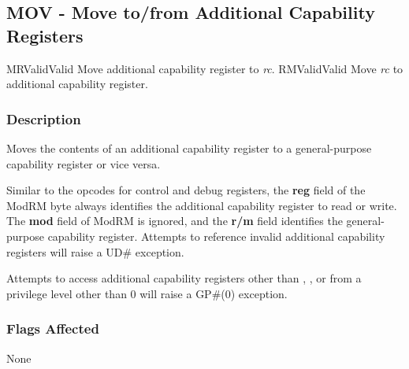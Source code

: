 \clearpage
{}
{}
\subsection*{MOV - Move to/from Additional Capability Registers}

\begin{x86opcodetable}
  {MR}{Valid}{Valid}
  {Move additional capability register to \emph{rc}.}
  {RM}{Valid}{Valid}
  {Move \emph{rc} to additional capability register.}
\end{x86opcodetable}

\begin{x86opentable}
\end{x86opentable}

\subsubsection*{Description}

Moves the contents of an additional capability register to a
general-purpose capability register or vice versa.

Similar to the  opcodes for control and debug
registers, the \textbf{reg} field of the ModRM byte always identifies
the additional capability register to read or write.  The \textbf{mod}
field of ModRM is ignored, and the \textbf{r/m} field identifies the
general-purpose capability register.  Attempts to reference invalid
additional capability registers will raise a UD\# exception.

Attempts to access additional capability registers other than \CFS{},
\CGS{}, or \DDC{} from a privilege level other than 0 will raise a
GP\#(0) exception.

\subsubsection*{Flags Affected}

None
